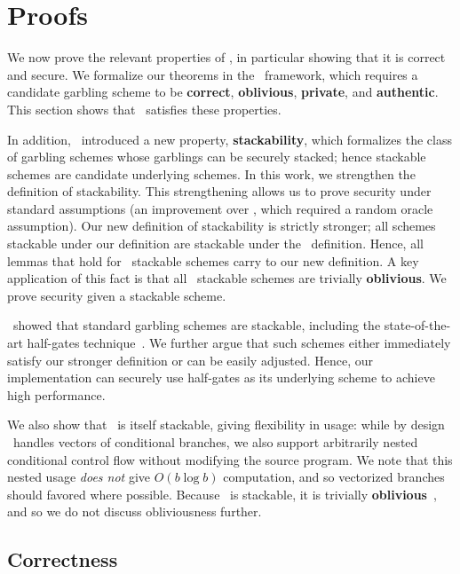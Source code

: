 \section{Proofs}\label{sec:proof}

We now prove the relevant properties of \ourscheme, in particular
showing that it is correct and secure.
We formalize our theorems in the~\cite{CCS:BelHoaRog12} framework,
which requires a candidate garbling scheme to be \textbf{correct},
\textbf{oblivious}, \textbf{private}, and \textbf{authentic}.
This section shows that \ourscheme\ satisfies these properties.

In addition, \HK\ introduced a new property, \textbf{stackability}, which
formalizes the class of garbling schemes whose garblings can be
securely stacked; hence stackable schemes are candidate underlying
schemes.
%
In this work, we strengthen the definition of stackability.
This strengthening allows us to prove security under standard
assumptions (an improvement over \HK, which required a random oracle
assumption).
Our new definition of stackability is strictly stronger; all schemes
stackable under our definition are stackable under the \HK\
definition.
Hence, all lemmas that hold for \HK\ stackable schemes
carry to our new definition.
A key application of this fact is that all \HK\ stackable schemes
are trivially \textbf{oblivious}.
We prove security given a stackable scheme.

\HK\ showed that standard garbling schemes are stackable, including
the state-of-the-art half-gates technique~\cite{EC:ZahRosEva15}.
We further argue that such schemes either immediately satisfy our
stronger definition or can be easily adjusted.
Hence, our implementation can securely use half-gates as its underlying
scheme to achieve high performance.

We also show that \ourscheme\ is itself stackable, giving
flexibility in usage: while by design \ourscheme\ handles vectors
of conditional branches, we also support arbitrarily nested
conditional control flow without modifying the source program.
%
We note that this nested usage \emph{does not} give $O(b\log b)$
computation, and so vectorized branches should favored where possible.
Because \ourscheme\ is stackable, it is trivially
\textbf{oblivious}~\HK,
and so we do not discuss obliviousness further.



\subsection{Correctness}\label{sec:correctness}

